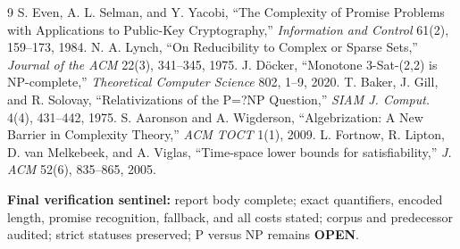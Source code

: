 \documentclass[11pt]{article}
\newcommand{\OPEN}{\textbf{OPEN}}
\begin{document}
\begin{thebibliography}{9}
 S. Even, A. L. Selman, and Y. Yacobi,
``The Complexity of Promise Problems with Applications to Public-Key
Cryptography,'' \emph{Information and Control} 61(2), 159--173, 1984.
 N. A. Lynch, ``On Reducibility to Complex or Sparse Sets,''
\emph{Journal of the ACM} 22(3), 341--345, 1975.
 J. D\"ocker, ``Monotone 3-Sat-(2,2) is NP-complete,''
\emph{Theoretical Computer Science} 802, 1--9, 2020.
 T. Baker, J. Gill, and R. Solovay,
``Relativizations of the P=?NP Question,'' \emph{SIAM J. Comput.} 4(4),
431--442, 1975.
 S. Aaronson and A. Wigderson, ``Algebrization: A New Barrier
in Complexity Theory,'' \emph{ACM TOCT} 1(1), 2009.
 L. Fortnow, R. Lipton, D. van Melkebeek, and A. Viglas,
``Time-space lower bounds for satisfiability,'' \emph{J. ACM} 52(6),
835--865, 2005.
\end{thebibliography}

\noindent\textbf{Final verification sentinel:} report body complete; exact
quantifiers, encoded length, promise recognition, fallback, and all costs
stated; corpus and predecessor audited; strict statuses preserved; P versus
NP remains \OPEN.
\end{document}
